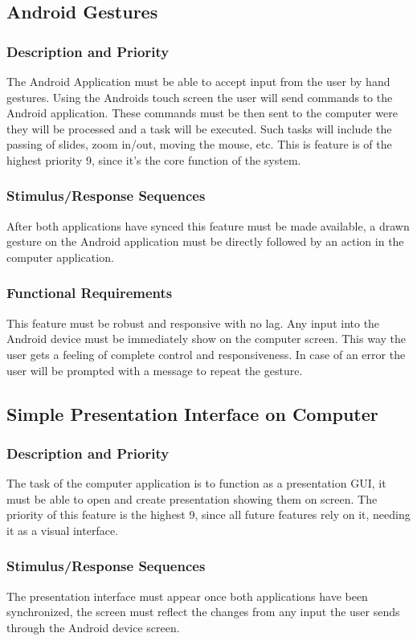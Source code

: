 \documentclass{article}
\begin{document}
\subsection{Android Gestures}
\subsubsection{Description and Priority}
The Android Application must be able to accept input from the user by hand gestures. 
Using the Androids touch screen the user will send commands to the Android application. 
These commands must be then sent to the computer were they will be processed and a task will be executed. 
Such tasks will include the passing of slides, zoom in/out, moving the mouse, etc. 
This is feature is of the highest priority 9, since it’s the core function of the system.
\subsubsection{Stimulus/Response Sequences}
After both applications have synced this feature must be made available, a drawn gesture on the Android application must be directly followed by an action in the computer application.
\subsubsection{Functional Requirements}
This feature must be robust and responsive with no lag. 
Any input into the Android device must be immediately show on the computer screen. 
This way the user gets a feeling of complete control and responsiveness. 
In case of an error the user will be prompted with a message to repeat the gesture.

\subsection{Simple Presentation Interface on Computer}
\subsubsection{Description and Priority}
The task of the computer application is to function as a presentation GUI, it must be able to open and create presentation showing them on screen. 
The priority of this feature is the highest 9, since all future features rely on it, needing it as a visual interface.
\subsubsection{Stimulus/Response Sequences}
The presentation interface must appear once both applications have been synchronized, the screen must reflect the changes from any input the user sends through the Android device screen.
\end{document}
